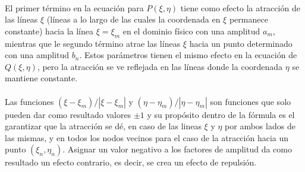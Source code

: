 \documentclass[letterpaper, openright, 12pt]{book}
\begin{document}
    \paragraph*{}
    El primer término en la ecuación para $P(\xi, \eta)$ tiene como efecto
    la atracción de las líneas $\xi$ (líneas a lo largo de las cuales la
    coordenada en $\xi$ permanece constante) hacia la línea $\xi = \xi_{m}$
    en el dominio físico con una amplitud $a_{m}$, mientras que le segundo
    término atrae las líneas $\xi$ hacia un punto determinado con una
    amplitud $b_{n}$. Estos parámetros tienen el mismo efecto en la ecuación
    de $Q(\xi, \eta)$, pero la atracción se ve reflejada en las líneas donde
    la coordenada $\eta$ se mantiene constante.

    \paragraph*{}
    Las funciones $(\xi - \xi_{m}) / |\xi - \xi_{m}|$ y
    $(\eta - \eta_{m}) / |\eta - \eta_{m}|$
    son funciones que solo pueden dar como resultado valores $\pm 1$ y su
    propósito dentro de la fórmula es el garantizar que la atracción se dé,
    en caso de las lineas $\xi$ y $\eta$ por ambos lados de las mismas, y en
    todos los nodos vecinos para el caso de la atracción hacia un punto
    $(\xi_{n}, \eta_{n})$. Asignar un valor negativo a los factores de
    amplitud da como resultado un efecto contrario, es decir, se crea un
    efecto de repulsión.
\end{document}
